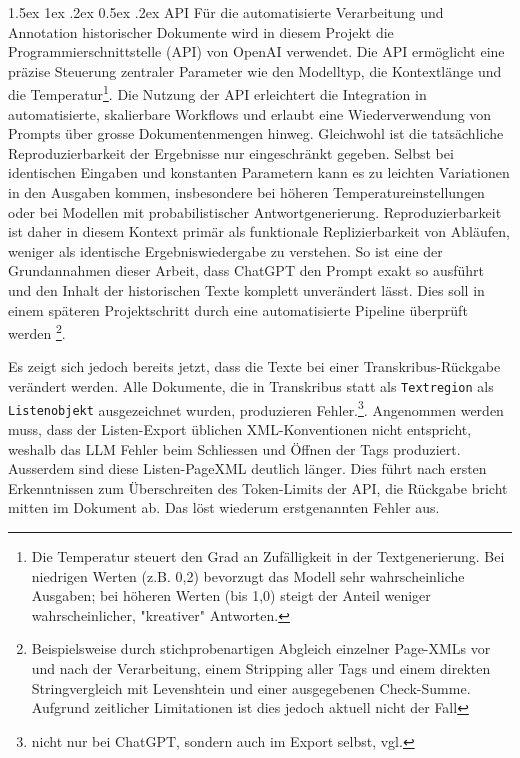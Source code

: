 \documentclass[12pt, a4paper, ngerman, bidi=default]{article}
\makeatletter
\newcommand{\code}[1]{\colorbox{VeryLightGray}{\texttt{#1}}} %
\let\oldparagraph\paragraph%
\renewcommand{\paragraph}{
    \@ifstar%
      \xxxParagraphStar%
      \xxxParagraphNoStar%
 }
\newcommand{\xxxParagraphStar}[1]{\oldparagraph*{#1}\mbox{}}
\newcommand{\xxxParagraphNoStar}[1]{\oldparagraph{#1}\mbox{}}
\renewcommand\paragraph{\@startsection{paragraph}{4}{0em}%
  {1.5ex \@plus1ex \@minus.2ex}%
  {0.5ex \@plus.2ex}%
  {\normalfont\normalsize\bfseries\itshape}}
\makeatother
\begin{document}
\paragraph{API}
Für die automatisierte Verarbeitung und Annotation historischer Dokumente wird in diesem Projekt die Programmierschnittstelle (API) von OpenAI verwendet. Die API ermöglicht eine präzise Steuerung zentraler Parameter wie den Modelltyp, die Kontextlänge und die Temperatur\footnote{Die Temperatur steuert den Grad an Zufälligkeit in der Textgenerierung. Bei niedrigen Werten (z.B. 0,2) bevorzugt das Modell sehr wahrscheinliche Ausgaben; bei höheren Werten (bis 1{,}0) steigt der Anteil weniger wahrscheinlicher, "kreativer" Antworten.}.
Die Nutzung der API erleichtert die Integration in automatisierte, skalierbare Workflows und erlaubt eine Wiederverwendung von Prompts über grosse Dokumentenmengen hinweg. Gleichwohl ist die tatsächliche Reproduzierbarkeit der Ergebnisse nur eingeschränkt gegeben. Selbst bei identischen Eingaben und konstanten Parametern kann es zu leichten Variationen in den Ausgaben kommen, insbesondere bei höheren Temperatureinstellungen oder bei Modellen mit probabilistischer Antwortgenerierung. Reproduzierbarkeit ist daher in diesem Kontext primär als funktionale Replizierbarkeit von Abläufen, weniger als identische Ergebniswiedergabe zu verstehen. So ist eine der Grundannahmen dieser Arbeit, dass ChatGPT den Prompt exakt so ausführt und den Inhalt der historischen Texte komplett unverändert lässt. Dies soll in einem späteren Projektschritt durch eine automatisierte Pipeline überprüft werden \footnote{Beispielsweise durch stichprobenartigen Abgleich einzelner Page-XMLs vor und nach der Verarbeitung, einem Stripping aller Tags und einem direkten Stringvergleich mit Levenshtein und einer ausgegebenen Check-Summe. Aufgrund zeitlicher Limitationen ist dies jedoch aktuell nicht der Fall}. 

Es zeigt sich jedoch bereits jetzt, dass die Texte bei einer Transkribus-Rückgabe verändert werden. Alle Dokumente, die in Transkribus statt als \code{Textregion} als \code{Listenobjekt} ausgezeichnet wurden, produzieren Fehler.\footnote{nicht nur bei ChatGPT, sondern auch im Export selbst, vgl. }. Angenommen werden muss, dass der Listen-Export üblichen XML-Konventionen nicht entspricht, weshalb das LLM Fehler beim Schliessen und Öffnen der Tags produziert. Ausserdem sind diese Listen-PageXML deutlich länger. Dies führt  nach ersten Erkenntnissen zum Überschreiten des Token-Limits der API, die Rückgabe bricht mitten im Dokument ab. Das löst wiederum erstgenannten Fehler aus.
 
\end{document}

